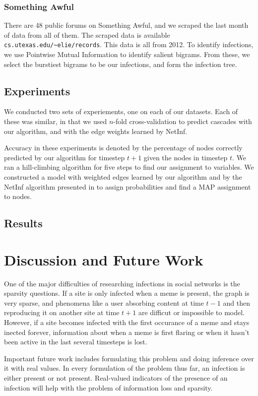 \documentclass{article} %
\begin{document}
\subsubsection{Something Awful}
 There are 48 public forums on Something Awful, and we scraped the last month of data from all of them.  The scraped data is available \texttt{cs.utexas.edu/\textasciitilde elie/records}. This data is all from 2012. To identify infections, we use Pointwise Mutual Information \cite{pmi} to identify salient bigrams. From these, we select the burstiest bigrams to be our infections, and form the infection tree.

\subsection{Experiments}
\label{experiments}

We conducted two sets of experiements, one on each of our datasets. Each of these was similar, in that we used $n$-fold cross-validation to predict cascades with our algorithm, and with the edge weights learned by NetInf.


Accuracy in these experiments is denoted by the percentage of nodes correctly predicted by our algorithm for timestep $t+1$ given the nodes in timestep $t$. We ran a hill-climbing algorithm for five steps to find our assignment to variables. We constructed a model with weighted edges learned by our algorithm and by the NetInf algorithm presented in \cite{netinf} to assign probabilities and find a MAP assignment to nodes.

\subsection{Results}
\label{results}



\section{Discussion and Future Work}
\label{discussion}

One of the major difficulties of researching infections in social networks is the sparsity questions. If a site is only infected when a meme is present, the graph is very sparse, and phenomena like a user absorbing content at time $t-1$ and then reproducing it on another site at time $t+1$ are difficut or impossible to model. However, if a site becomes infected with the first occurance of a meme and stays inected forever, information about when a meme is first flaring or when it hasn't been active in the last several timesteps is lost.

Important future work includes formulating this problem and doing inference over it with real values. In every formulation of the problem thus far, an infection is either present or not present. Real-valued indicators of the presence of an infection will help with the problem of information loss and sparsity.

{}
\label{refs}

\end{document}
